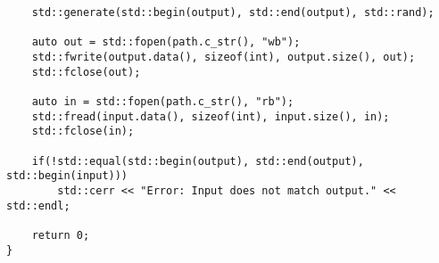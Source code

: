 \begin{appendix}
\begin{lstlisting}
    std::generate(std::begin(output), std::end(output), std::rand);
    
    auto out = std::fopen(path.c_str(), "wb");
    std::fwrite(output.data(), sizeof(int), output.size(), out);
    std::fclose(out);
    
    auto in = std::fopen(path.c_str(), "rb");
    std::fread(input.data(), sizeof(int), input.size(), in);
    std::fclose(in);
    
    if(!std::equal(std::begin(output), std::end(output), std::begin(input)))
        std::cerr << "Error: Input does not match output." << std::endl;
        
    return 0;
}
\end{lstlisting}

\end{appendix}